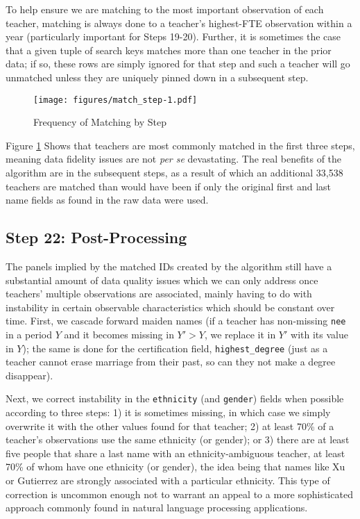 \begin{appendices}
To help ensure we are matching to the most important observation of each
teacher, matching is always done to a teacher's highest-FTE observation
within a year (particularly important for Steps 19-20). Further, it is
sometimes the case that a given tuple of search keys matches more than
one teacher in the prior data; if so, these rows are simply ignored for
that step and such a teacher will go unmatched unless they are uniquely
pinned down in a subsequent step.

\begin{figure}[htbp]
\centering
\texttt{[image: figures/match\_step-1.pdf]}
\caption{\label{fig:step}Frequency of Matching by Step}
\end{figure}

Figure \ref{fig:step} Shows that teachers are most commonly matched in
the first three steps, meaning data fidelity issues are not \emph{per
se} devastating. The real benefits of the algorithm are in the
subsequent steps, as a result of which an additional 33,538 teachers are
matched than would have been if only the original first and last name
fields as found in the raw data were used.

\subsection{Step 22: Post-Processing}\label{step-22-post-processing}

The panels implied by the matched IDs created by the algorithm still
have a substantial amount of data quality issues which we can only
address once teachers' multiple observations are associated, mainly
having to do with instability in certain observable characteristics
which should be constant over time. First, we cascade forward maiden
names (if a teacher has non-missing \texttt{nee} in a period \(Y\) and
it becomes missing in \(Y'>Y\), we replace it in \(Y'\) with its value
in \(Y\)); the same is done for the certification field,
\texttt{highest\_degree} (just as a teacher cannot erase marriage from
their past, so can they not make a degree disappear).

Next, we correct instability in the \texttt{ethnicity} (and
\texttt{gender}) fields when possible according to three steps: 1) it is
sometimes missing, in which case we simply overwrite it with the other
values found for that teacher; 2) at least 70\% of a teacher's
observations use the same ethnicity (or gender); or 3) there are at
least five people that share a last name with an ethnicity-ambiguous
teacher, at least 70\% of whom have one ethnicity (or gender), the idea
being that names like Xu or Gutierrez are strongly associated with a
particular ethnicity. This type of correction is uncommon enough not to
warrant an appeal to a more sophisticated approach commonly found in
natural language processing applications.


\end{appendices}
